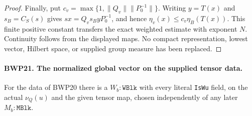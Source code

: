 \begin{proof}
Finally, put \(c_v=\max\{1,\|Q_v\|\|P_0^{-1}\|\}\).
Writing \(y=T(x)\) and \(s_B=C_S(s)\) gives
\(sx=Q_vs_ByP_0^{-1}\), and hence
\(\eta_v(x)\le c_v\eta_B(T(x))\).
This finite positive constant transfers the exact weighted estimate
with exponent \(N\).  Continuity follows from the displayed maps.
No compact representation, lowest vector, Hilbert space, or supplied
group measure has been replaced.
\end{proof}

\paragraph{BWP21. The normalized global vector on the supplied tensor data.}
\label{claim:BWP21}
For the data of BWP20 there is a \(W_b:\texttt{WBlk}\) with
every literal \texttt{IsWu} field, on the actual \(\nu_Q(u)\)
and the given tensor map, chosen independently of any later
\(M_b:\texttt{MBlk}\).

